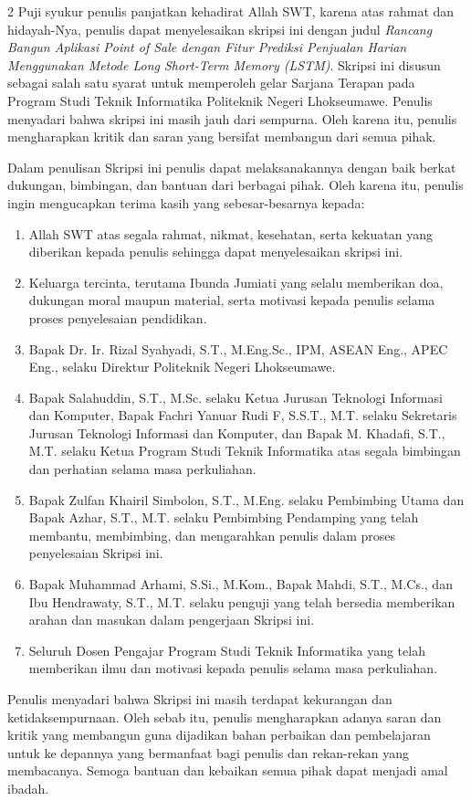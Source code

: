 \documentclass[12pt, a4paper, onecolumn, oneside]{report}
\begin{document}
\begin{spacing}{2}
\noindent Puji syukur penulis panjatkan kehadirat Allah SWT, karena atas rahmat dan hidayah-Nya, penulis dapat menyelesaikan skripsi ini dengan judul \textit{Rancang Bangun Aplikasi Point of Sale dengan Fitur Prediksi Penjualan Harian Menggunakan Metode Long Short-Term Memory (LSTM)}. Skripsi ini disusun sebagai salah satu syarat untuk memperoleh gelar Sarjana Terapan pada Program Studi Teknik Informatika Politeknik Negeri Lhokseumawe. Penulis menyadari bahwa skripsi ini masih jauh dari sempurna. Oleh karena itu, penulis mengharapkan kritik dan saran yang bersifat membangun dari semua pihak.

\noindent Dalam penulisan Skripsi ini penulis dapat melaksanakannya dengan baik berkat dukungan, bimbingan, dan bantuan dari berbagai pihak. Oleh karena itu, penulis ingin mengucapkan terima kasih yang sebesar-besarnya kepada:

\begin{enumerate}
    \item Allah SWT atas segala rahmat, nikmat, kesehatan, serta kekuatan yang diberikan kepada penulis sehingga dapat menyelesaikan skripsi ini.
    \item Keluarga tercinta, terutama Ibunda Jumiati yang selalu memberikan doa, dukungan moral maupun material, serta motivasi kepada penulis selama proses penyelesaian pendidikan.
    \item Bapak Dr. Ir. Rizal Syahyadi, S.T., M.Eng.Sc., IPM, ASEAN Eng., APEC Eng., selaku Direktur Politeknik Negeri Lhokseumawe.
    \item Bapak Salahuddin, S.T., M.Sc. selaku Ketua Jurusan Teknologi Informasi dan Komputer, Bapak Fachri Yanuar Rudi F, S.S.T., M.T. selaku Sekretaris Jurusan Teknologi Informasi dan Komputer, dan Bapak M. Khadafi, S.T., M.T. selaku Ketua Program Studi Teknik Informatika atas segala bimbingan dan perhatian selama masa perkuliahan.
    \item Bapak Zulfan Khairil Simbolon, S.T., M.Eng. selaku Pembimbing Utama dan Bapak Azhar, S.T., M.T. selaku Pembimbing Pendamping yang telah membantu, membimbing, dan mengarahkan penulis dalam proses penyelesaian Skripsi ini.
    \item Bapak Muhammad Arhami, S.Si., M.Kom., Bapak Mahdi, S.T., M.Cs., dan Ibu Hendrawaty, S.T., M.T. selaku penguji yang telah bersedia memberikan arahan dan masukan dalam pengerjaan Skripsi ini.
    \item Seluruh Dosen Pengajar Program Studi Teknik Informatika yang telah memberikan ilmu dan motivasi kepada penulis selama masa perkuliahan.
\end{enumerate}

\noindent Penulis menyadari bahwa Skripsi ini masih terdapat kekurangan dan ketidaksempurnaan. Oleh sebab itu, penulis mengharapkan adanya saran dan kritik yang membangun guna dijadikan bahan perbaikan dan pembelajaran untuk ke depannya yang bermanfaat bagi penulis dan rekan-rekan yang membacanya. Semoga bantuan dan kebaikan semua pihak dapat menjadi amal ibadah.

\end{spacing}
\vspace{1.5cm}
\end{document}
